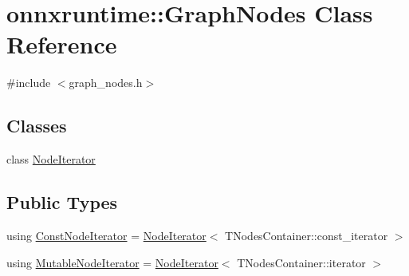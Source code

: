 \hypertarget{classonnxruntime_1_1GraphNodes}{}\section{onnxruntime\+:\+:Graph\+Nodes Class Reference}
\label{classonnxruntime_1_1GraphNodes}


{\ttfamily \#include $<$graph\+\_\+nodes.\+h$>$}

\subsection*{Classes}
\begin{DoxyCompactItemize}
\item 
class \mbox{\hyperlink{classonnxruntime_1_1GraphNodes_1_1NodeIterator}{Node\+Iterator}}
\end{DoxyCompactItemize}
\subsection*{Public Types}
\begin{DoxyCompactItemize}
\item 
using \mbox{\hyperlink{classonnxruntime_1_1GraphNodes_a291880456b7298e7daededf91e494b6a}{Const\+Node\+Iterator}} = \mbox{\hyperlink{classonnxruntime_1_1GraphNodes_1_1NodeIterator}{Node\+Iterator}}$<$ T\+Nodes\+Container\+::const\+\_\+iterator $>$
\item 
using \mbox{\hyperlink{classonnxruntime_1_1GraphNodes_ab5a670376171a0bc405018f0d6bb909d}{Mutable\+Node\+Iterator}} = \mbox{\hyperlink{classonnxruntime_1_1GraphNodes_1_1NodeIterator}{Node\+Iterator}}$<$ T\+Nodes\+Container\+::iterator $>$
\end{DoxyCompactItemize}
